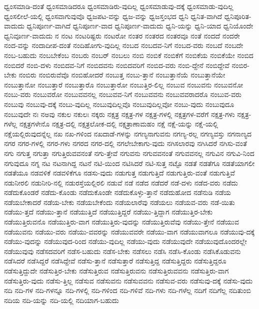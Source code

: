 {ಧ್ವಂಸಮಾಡಿ-ದಂತೆ
ಧ್ವಂಸಮಾಡಿದರೂ
ಧ್ವಂಸಮಾಡಿರು-ವುದಿಲ್ಲ
ಧ್ವಂಸಮಾಡುವು-ದಕ್ಕೆ
ಧ್ವಂಸಮಾಡು-ವುದಿಲ್ಲ
ಧ್ವಂಸಲೀಲೆ-ಯಲ್ಲಿ
ಧ್ವಂಸವಾಗುವುವೊ
ಧ್ವಜಪಟ-ವನ್ನು
ಧ್ವಜ-ವನ್ನು
ಧ್ವಜಸ್ತಂಭದ
ಧ್ವನಿ
ಧ್ವನಿತ-ವಾಗಿದೆ
ಧ್ವನಿಪೂರಿತ-ವಾದುದು
ಧ್ವನಿಪೂರ್ಣ-ವಾಗಿದೆ
ಧ್ವನಿಪೂರ್ಣ-ವಾದ
ಧ್ವನಿಪೂರ್ಣ-ವಾದುದು
ಧ್ವನಿ-ಯನ್ನು
ಧ್ವನಿ-ಯಾದ
ಧ್ವನಿಯೊಂದೇ
ಧ್ವನಿವೂರ್ಣ-ವಾದುದು
ನ
ನಂಟ
ನಂಟರಿಷ್ಟರು
ನಂಟರೋ
ನಂತರ
ನಂತರದ
ನಂತರವೂ
ನಂತೆ
ನಂದದೆ
ನಂದರೇ
ನಂದ-ವನ್ನು
ನಂದಾದೀಪ-ದಂತೆ
ನಂದಿಹೋಗು-ವುದಿಲ್ಲ
ನಂಬದ
ನಂಬದವ-ನಿಗೆ
ನಂಬದ-ವರು
ನಂಬದೆ
ನಂಬದೇ
ನಂಬ-ಬಹುದು
ನಂಬಬೇಕೆಂಬ
ನಂಬರು
ನಂಬರ್
ನಂಬಲು
ನಂಬಿ
ನಂಬಿಕೆ
ನಂಬಿಕೆಗೆ
ನಂಬಿಕೆಯ
ನಂಬಿಕೆಯೇ
ನಂಬಿದ
ನಂಬಿದರೆ
ನಂಬಿ-ದಳು
ನಂಬಿದವ-ನಿಗೆ
ನಂಬಿದವನು
ನಂಬಿದವರಿಗೆ
ನಂಬಿದ-ವರು
ನಂಬಿ-ದ್ದೇನೆ
ನಂಬಿದ್ದೇವೆ
ನಂಬಿರ-ಬೇಕು
ನಂಬಿರು
ನಂಬಿರುವೆವೊ
ನಂಬಿಹೋದರೆ
ನಂಬುತ್ತ
ನಂಬು-ತ್ತಾನೆ
ನಂಬುತ್ತಾನೆಯೆ
ನಂಬುತ್ತಾನೆಯೇ
ನಂಬುತ್ತಾನೋ
ನಂಬುತ್ತಾರೆ
ನಂಬುತ್ತಾರೊ
ನಂಬುತ್ತಾರೋ
ನಂಬುತ್ತಿರ-ಲಿಲ್ಲ
ನಂಬುವ
ನಂಬುವನು
ನಂಬುವನೋ
ನಂಬು-ವರು
ನಂಬುವರೋ
ನಂಬುವವನಲ್ಲ
ನಂಬುವವ-ನಿಗೆ
ನಂಬುವವನು
ನಂಬುವವರಾದರೊ
ನಂಬುವ-ವರು
ನಂಬುವು
ನಂಬುವು-ದಕ್ಕೆ
ನಂಬು-ವುದಿಲ್ಲ
ನಂಬುವುದಿಲ್ಲವೊ
ನಂಬುವುದಿಲ್ಲವೋ
ನಂಬು-ವುದು
ನಂಬುವುದೂ
ನಂಬುವುದೇ
ನಃ
ನಅವು
ನಕುಲ
ನಕುಲಃ
ನಕ್ಕರು
ನಕ್ಷತ್ರ
ನಕ್ಷತ್ರ-ಗಳ
ನಕ್ಷತ್ರ-ಗಳಲ್ಲಿ
ನಕ್ಷತ್ರಗಳ-ವರೆಗೆ
ನಕ್ಷತ್ರ-ಗಳು
ನಕ್ಷತ್ರ-ಗಳೆಲ್ಲ
ನಕ್ಷತ್ರಗಳೇನೊ
ನಕ್ಷತ್ರ-ದಲ್ಲಿ
ನಕ್ಷತ್ರಲೋಕ-ದಲ್ಲಿ
ನಕ್ಷತ್ರಾಣಾಮಹಂ
ನಕ್ಷೆ
ನಕ್ಷೆ-ಯನ್ನು
ನಕ್ಷೆ-ಯಲ್ಲಿ
ನಕ್ಷೆಯಲ್ಲಿರುವುದನ್ನೆಲ್ಲ
ನಖ
ನಖ-ಗಳಿಂದ
ನಖದಾಡೆ-ಗಳನ್ನು
ನಗಣ್ಯನಾಗುವನು
ನಗಣ್ಯ-ರಲ್ಲ
ನಗಣ್ಯವಸ್ತು
ನಗನಾಣ್ಯದ
ನಗರ
ನಗರ-ಗಳಲ್ಲಿ
ನಗರ-ಗಳು
ನಗರದ
ನಗರ-ದಲ್ಲಿ
ನಗಲೇಬೇಕಾಗು-ವುದು
ನಗಿಸಲಾರವು
ನಗಿಸಿದರೆ
ನಗಿಸು-ವಂತೆ
ನಗು
ನಗುತ್ತ
ನಗುತ್ತಾ
ನಗುತ್ತಿರುವವನಂತೆ
ನಗು-ತ್ತೇವೆ
ನಗುವನು
ನಗುವವನಂತೆ
ನಗುವವನಲ್ಲ
ನಗುವಿನ
ನಗುವಿ-ನಿಂದ
ನಗುವುದೂ
ನಗ್ನ
ನಟ
ನಟನಾಗಿದ್ದ
ನಟನೆ
ನಟಿ-ಯಿಂದ
ನಟಿಸಿದರೆ
ನಟಿ-ಸುತ್ತ
ನಟ್ಟೊ
ನಡತೆ
ನಡತೆಗೂ
ನಡತೆಯಾಗಲೀ
ನಡತೆಯೂ
ನಡವಳಿಕೆ
ನಡವಳಿಕೆಗೂ
ನಡಸು-ವುದು
ನಡುಗುತ್ತ
ನಡುಗುತ್ತಿದೆ
ನಡುಗುತ್ತಿರು-ವಂತೆ
ನಡುಗುತ್ತಿವೆ
ನಡುನೀರಲಿ
ನಡುನೀರಿ-ನಲ್ಲಿ
ನಡುರಸ್ತೆಯಲ್ಲಿರಲಿ
ನಡುವೆ
ನಡೆ
ನಡೆದ
ನಡೆದರೆ
ನಡೆ-ದಳು
ನಡೆದ-ವರು
ನಡೆದು
ನಡೆದುಕೊಂಡರೆ
ನಡೆದು-ಕೊಂಡು
ನಡೆದುಕೊಂಡೇ
ನಡೆದುಕೊಳ್ಳು-ತ್ತಾನೆ
ನಡೆದುಹೋದ
ನಡೆನುಡಿ
ನಡೆಯ
ನಡೆಯಬೇಕಾದರೆ
ನಡೆಯ-ಬೇಕು
ನಡೆಯಬೇಕೆಂದು
ನಡೆಯಲಾರೆವು
ನಡೆಯಲು
ನಡೆಯವ-ವರು
ನಡೆ-ಯಿತು
ನಡೆಯು-ತ್ತದೆ
ನಡೆಯು-ತ್ತಾನೆ
ನಡೆಯುತ್ತಿದೆ
ನಡೆಯುತ್ತಿದ್ದರೆ
ನಡೆಯು-ತ್ತಿದ್ದಾಗ
ನಡೆಯುತ್ತಿರ-ಬೇಕು
ನಡೆಯುತ್ತಿರುವನೊ
ನಡೆಯುತ್ತಿರು-ವಾಗ
ನಡೆಯುತ್ತಿರು-ವುದನ್ನು
ನಡೆಯುತ್ತಿರುವೆವು
ನಡೆಯು-ತ್ತೇನೆ
ನಡೆಯುವ
ನಡೆಯುವನು
ನಡೆಯು-ವರು
ನಡೆಯು-ವವರನ್ನು
ನಡೆಯುವವರೇ
ನಡೆಯು-ವಾಗ
ನಡೆಯುವಾಗಲೂ
ನಡೆಯುವು-ದಕ್ಕೆ
ನಡೆಯು-ವುದನ್ನು
ನಡೆಯುವುದ-ರಿಂದ
ನಡೆಯು-ವುದಿಲ್ಲ
ನಡೆಯು-ವುದು
ನಡೆಯುವುದೇ
ನಡೆಯುವುದೊಂದರಲ್ಲೇ
ನಡೆಯುವುವು
ನಡೆಸದವರಿಗೆ
ನಡೆಸ-ಬಹುದು
ನಡೆಸ-ಬೇಕು
ನಡೆಸಲು
ನಡೆಸಿ
ನಡೆಸಿ-ಕೊಂಡು
ನಡೆಸಿಕೊಡುವನು
ನಡೆಸಿದರೆ
ನಡೆಸಿದ್ದರೆ
ನಡೆಸಿದ್ದೇವೆ
ನಡೆಸು-ತ್ತಾನೆ
ನಡೆಸುತ್ತಾರೆ
ನಡೆಸುತ್ತಿದ್ದ
ನಡೆಸುತ್ತಿದ್ದರು
ನಡೆಸುತ್ತಿದ್ದರೂ
ನಡೆಸುತ್ತಿದ್ದುದೇ
ನಡೆಸುತ್ತಿರ-ಬೇಕು
ನಡೆಸುತ್ತಿರುವ
ನಡೆಸುತ್ತಿರುವನು
ನಡೆಸುತ್ತಿರುವವನು
ನಡೆಸುತ್ತಿರು-ವಾಗ
ನಡೆಸುತ್ತಿರು-ವುದು
ನಡೆಸು-ತ್ತಿಲ್ಲ
ನಡೆಸುವ
ನಡೆಸುವನು
ನಡೆಸುವವನು
ನಡೆಸುವ-ವರು
ನಡೆಸುವು-ದಕ್ಕೆ
ನಡೆಸು-ವುದು
ನದಿ
ನದಿ-ಗಳ
ನದಿ-ಗಳನ್ನೂ
ನದಿ-ಗಳಲ್ಲಿ
ನದಿ-ಗಳಿಂದ
ನದಿ-ಗಳಿವೆ
ನದಿ-ಗಳು
ನದಿ-ಗಳೆಲ್ಲ
ನದಿಗೆ
ನದಿಗೆಲ್ಲ
ನದಿತುಂಬಿ
ನದಿಯ
ನದಿ-ಯನ್ನು
ನದಿ-ಯಲ್ಲಿ
ನದಿಯಾಗ-ಬಹುದು
}
